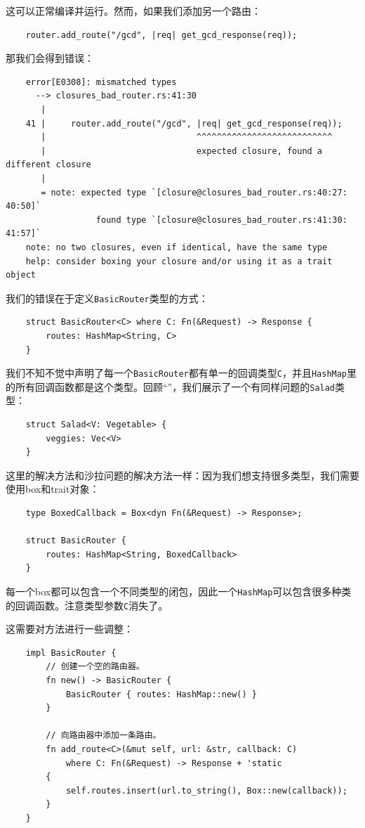 这可以正常编译并运行。然而，如果我们添加另一个路由：
\begin{verbatim}
    router.add_route("/gcd", |req| get_gcd_response(req));
\end{verbatim}

那我们会得到错误：
\begin{verbatim}
    error[E0308]: mismatched types
      --> closures_bad_router.rs:41:30
       |
    41 |     router.add_route("/gcd", |req| get_gcd_response(req));
       |                              ^^^^^^^^^^^^^^^^^^^^^^^^^^^
       |                              expected closure, found a different closure
       |
       = note: expected type `[closure@closures_bad_router.rs:40:27: 40:50]`
                  found type `[closure@closures_bad_router.rs:41:30: 41:57]`
    note: no two closures, even if identical, have the same type
    help: consider boxing your closure and/or using it as a trait object
\end{verbatim}

我们的错误在于定义\texttt{BasicRouter}类型的方式：
\begin{verbatim}
    struct BasicRouter<C> where C: Fn(&Request) -> Response {
        routes: HashMap<String, C>
    }
\end{verbatim}

我们不知不觉中声明了每一个\texttt{BasicRouter}都有单一的回调类型\texttt{C}，并且\texttt{HashMap}里的所有回调函数都是这个类型。回顾“”，我们展示了一个有同样问题的\texttt{Salad}类型：
\begin{verbatim}
    struct Salad<V: Vegetable> {
        veggies: Vec<V>
    }
\end{verbatim}
这里的解决方法和沙拉问题的解决方法一样：因为我们想支持很多类型，我们需要使用box和trait对象：
\begin{verbatim}
    type BoxedCallback = Box<dyn Fn(&Request) -> Response>;

    struct BasicRouter {
        routes: HashMap<String, BoxedCallback>
    }
\end{verbatim}

每一个box都可以包含一个不同类型的闭包，因此一个\texttt{HashMap}可以包含很多种类的回调函数。注意类型参数\texttt{C}消失了。

这需要对方法进行一些调整：
\begin{verbatim}
    impl BasicRouter {
        // 创建一个空的路由器。
        fn new() -> BasicRouter {
            BasicRouter { routes: HashMap::new() }
        }

        // 向路由器中添加一条路由。
        fn add_route<C>(&mut self, url: &str, callback: C)
            where C: Fn(&Request) -> Response + 'static
        {
            self.routes.insert(url.to_string(), Box::new(callback));
        }
    }
\end{verbatim}

